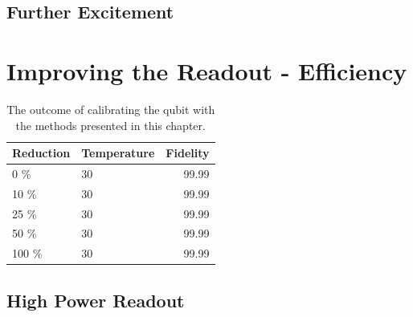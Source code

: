 \subsection{Further Excitement}

\section{Improving the Readout - Efficiency}


\begin{table}[h]
\centering
\caption{The outcome of calibrating the qubit with the methods presented in this chapter.}
\begin{tabular}{ll|r}
\hline
\textbf{Reduction}        & Temperature                  & Fidelity\\ \hline
0   \%                      &  30                        &  99.99\\
10  \%                     &  30                         &  99.99\\
25  \%                     &  30                         &  99.99\\
50  \%                     &  30                         &  99.99\\
100 \%                     &  30                         &  99.99\\
\end{tabular}
\label{tab:readout_infidelity_contribution_estimation}
\end{table}



\subsection{High Power Readout}

